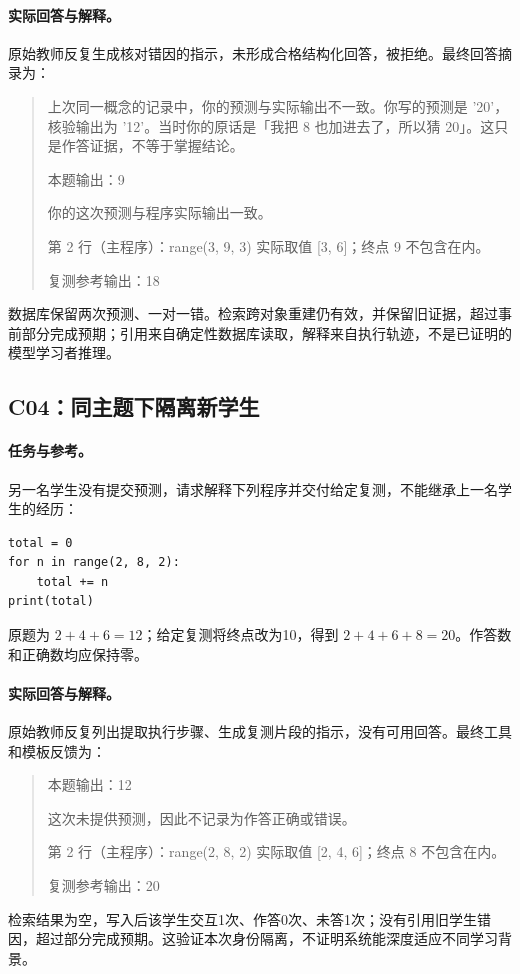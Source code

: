 \paragraph{实际回答与解释。}
原始教师反复生成核对错因的指示，未形成合格结构化回答，被拒绝。最终回答摘录为：
\begin{quote}\small
上次同一概念的记录中，你的预测与实际输出不一致。你写的预测是 '20'，核验输出为 '12'。当时你的原话是「我把 8 也加进去了，所以猜 20」。这只是作答证据，不等于掌握结论。

本题输出：9

你的这次预测与程序实际输出一致。

第 2 行（主程序）：range(3, 9, 3) 实际取值 [3, 6]；终点 9 不包含在内。

复测参考输出：18
\end{quote}
数据库保留两次预测、一对一错。检索跨对象重建仍有效，并保留旧证据，超过事前部分完成预期；引用来自确定性数据库读取，解释来自执行轨迹，不是已证明的模型学习者推理。

\subsection{C04：同主题下隔离新学生}
\paragraph{任务与参考。}
另一名学生没有提交预测，请求解释下列程序并交付给定复测，不能继承上一名学生的经历：
\begin{verbatim}
total = 0
for n in range(2, 8, 2):
    total += n
print(total)
\end{verbatim}
原题为 $2+4+6=12$；给定复测将终点改为10，得到 $2+4+6+8=20$。作答数和正确数均应保持零。

\paragraph{实际回答与解释。}
原始教师反复列出提取执行步骤、生成复测片段的指示，没有可用回答。最终工具和模板反馈为：
\begin{quote}\small
本题输出：12

这次未提供预测，因此不记录为作答正确或错误。

第 2 行（主程序）：range(2, 8, 2) 实际取值 [2, 4, 6]；终点 8 不包含在内。

复测参考输出：20
\end{quote}
检索结果为空，写入后该学生交互1次、作答0次、未答1次；没有引用旧学生错因，超过部分完成预期。这验证本次身份隔离，不证明系统能深度适应不同学习背景。

